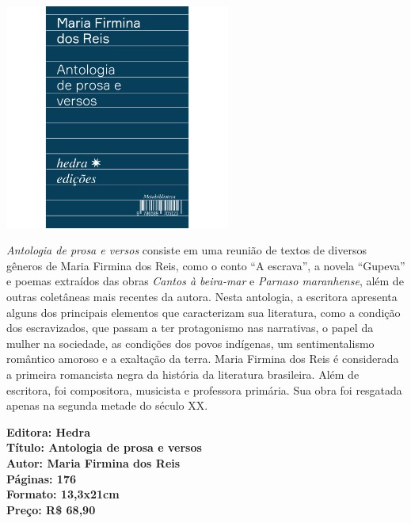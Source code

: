 \pagebreak

\begin{center}
\hspace*{-3.6cm}
\hspace*{3.1cm}\includegraphics[width=74mm]{./grid/firmina.png}
\end{center}

\hspace*{-7cm}\hrulefill\hspace*{-7cm}

\medskip

\noindent{}\textit{Antologia de prosa e versos} consiste em uma reunião de textos de diversos gêneros de Maria Firmina dos Reis, como o conto ``A escrava'', a novela ``Gupeva'' e poemas extraídos das obras \textit{Cantos à beira-mar} e \textit{Parnaso maranhense}, além de outras coletâneas mais recentes da autora. Nesta antologia, a escritora apresenta alguns dos principais elementos que caracterizam sua literatura, como a condição dos escravizados, que passam a ter protagonismo nas narrativas, o papel da mulher na sociedade, as condições dos povos indígenas, um sentimentalismo romântico amoroso e a exaltação da terra. Maria Firmina dos Reis é considerada a primeira romancista negra da história da literatura brasileira. Além de escritora, foi compositora, musicista e professora primária. Sua obra foi resgatada apenas na segunda metade do século XX.
\vfill

\noindent\begin{minipage}[c]{.5\linewidth}
{\small\textbf{
\hspace*{-.1cm}Editora: Hedra\\
Título: Antologia de prosa e versos\\
Autor: Maria Firmina dos Reis\\ 
Páginas: 176\\
Formato: 13,3x21cm\\
Preço: R\$ 68,90\\
}}
\end{minipage}


